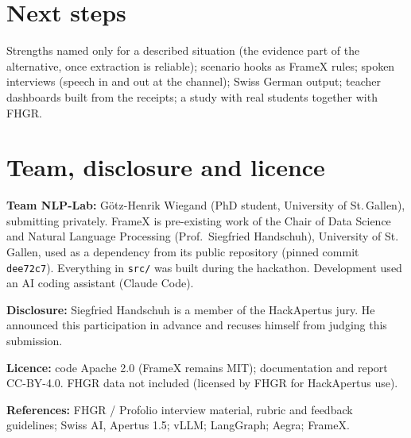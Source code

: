 \documentclass[10pt,a4paper]{article}
\begin{document}
\clearpage
\section{Next steps}
Strengths named only for a described situation (the evidence part of the alternative, once extraction is reliable); scenario hooks as FrameX
rules; spoken interviews (speech in and out at the channel); Swiss German output; teacher dashboards built from the receipts; a study with
real students together with FHGR.

\section*{Team, disclosure and licence}
\textbf{Team NLP-Lab:} Götz-Henrik Wiegand (PhD student, University of St.\,Gallen), submitting privately. FrameX is pre-existing work of the
Chair of Data Science and Natural Language Processing (Prof.\ Siegfried Handschuh), University of St.\,Gallen, used as a dependency from its public
repository (pinned commit \texttt{dee72c7}). Everything in \texttt{src/} was built during the hackathon. Development used an AI coding assistant
(Claude Code).

\textbf{Disclosure:} Siegfried Handschuh is a member of the HackApertus jury. He announced this participation in advance and recuses himself from
judging this submission.

\textbf{Licence:} code Apache 2.0 (FrameX remains MIT); documentation and report CC-BY-4.0. FHGR data not included (licensed by FHGR for
HackApertus use).

\textbf{References:} FHGR / Profolio interview material, rubric and feedback guidelines; Swiss AI, Apertus 1.5; vLLM; LangGraph; Aegra; FrameX.
\end{document}
